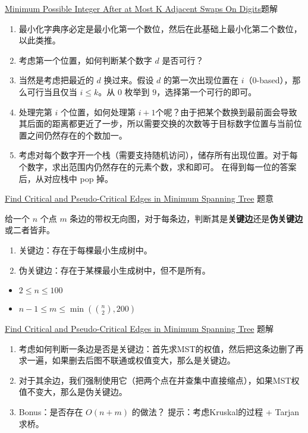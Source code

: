 \documentclass{beamer}
\begin{document}
\begin{frame}{\href{https://leetcode.com/problems/minimum-possible-integer-after-at-most-k-adjacent-swaps-on-digits/}{Minimum Possible Integer After at Most K Adjacent Swaps On Digits}}{题解}

\begin{enumerate}
    \item 最小化字典序必定是最小化第一个数位，然后在此基础上最小化第二个数位，以此类推。
    \item 考虑第一个位置，如何判断某个数字 $d$ 是否可行？
    \item 当然是考虑把最近的 $d$ 换过来。假设 $d$ 的第一次出现位置在 $i$（0-based），那么可行当且仅当 $i \le k$。从 $0$ 枚举到 $9$，选择第一个可行的即可。
    \item 处理完第 $i$ 个位置，如何处理第 $i+1$个呢？由于把某个数换到最前面会导致其后面的距离都更近了一步，所以需要交换的次数等于目标数字位置与当前位置之间仍然存在的个数加一。
    \item 考虑对每个数字开一个栈（需要支持随机访问），储存所有出现位置。对于每个数字，求出范围内仍然存在的元素个数，求和即可。 在得到每一位的答案后，从对应栈中 pop 掉。
\end{enumerate}
\end{frame}


\begin{frame}{\href{https://leetcode.com/problems/find-critical-and-pseudo-critical-edges-in-minimum-spanning-tree/}{Find Critical and Pseudo-Critical Edges in Minimum Spanning Tree}}
{题意}

给一个 $n$ 个点 $m$ 条边的带权无向图，对于每条边，判断其是\textbf{关键边}还是\textbf{伪关键边}或二者皆非。

\begin{enumerate}
    \item 关键边：存在于每棵最小生成树中。
    \item 伪关键边：存在于某棵最小生成树中，但不是所有。
\end{enumerate}

\begin{itemize}
    \item $2\le n\le 100$
    \item $n-1\le m\le \min(\binom{n}{2},200)$
\end{itemize}
\end{frame}


\begin{frame}{\href{https://leetcode.com/problems/find-critical-and-pseudo-critical-edges-in-minimum-spanning-tree/}{Find Critical and Pseudo-Critical Edges in Minimum Spanning Tree}}
{题解}

\begin{enumerate}
    \item 考虑如何判断一条边是否是关键边：首先求MST的权值，然后把这条边删了再求一遍，如果删去后图不联通或权值变大，那么是关键边。
    \item 对于其余边，我们强制使用它（把两个点在并查集中直接缩点），如果MST权值不变大，那么是伪关键边。
    \item Bonus：是否存在 $O(n+m)$ 的做法？ 提示：考虑Kruskal的过程 + Tarjan 求桥。
\end{enumerate}
\end{frame}
\end{document}

